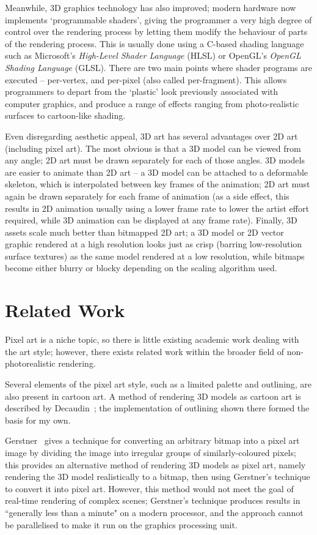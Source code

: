 \documentclass[12pt,twoside,notitlepage]{report}
\begin{document}
Meanwhile, 3D graphics technology has also improved; modern hardware now implements `programmable shaders', giving the programmer a very high degree of control over the rendering process by letting them modify the behaviour of parts of the rendering process. This is usually done using a C-based shading language such as Microsoft's \textit{High-Level Shader Language} (HLSL) or OpenGL's \textit{OpenGL Shading Language} (GLSL). There are two main points where shader programs are executed -- per-vertex, and per-pixel (also called per-fragment). This allows programmers to depart from the `plastic' look previously associated with computer graphics, and produce a range of effects ranging from photo-realistic surfaces to cartoon-like shading.

Even disregarding aesthetic appeal, 3D art has several advantages over 2D art (including pixel art). The most obvious is that a 3D model can be viewed from any angle; 2D art must be drawn separately for each of those angles. 3D models are easier to animate than 2D art -- a 3D model can be attached to a deformable skeleton, which is interpolated between key frames of the animation; 2D art must again be drawn separately for each frame of animation (as a side effect, this results in 2D animation usually using a lower frame rate to lower the artist effort required, while 3D animation can be displayed at any frame rate). Finally, 3D assets scale much better than bitmapped 2D art; a 3D model or 2D vector graphic rendered at a high resolution looks just as crisp (barring low-resolution surface textures) as the same model rendered at a low resolution, while bitmaps become either blurry or blocky depending on the scaling algorithm used.

\section{Related Work}

Pixel art is a niche topic, so there is little existing academic work dealing with the art style; however, there exists related work within the broader field of non-photorealistic rendering.

Several elements of the pixel art style, such as a limited palette and outlining, are also present in cartoon art. A method of rendering 3D models as cartoon art is described by Decaudin~\cite{Decaudin:1996:CLR}; the implementation of outlining shown there formed the basis for my own.

Gerstner~\cite{Gerstner:2012:PIA} gives a technique for converting an arbitrary bitmap into a pixel art image by dividing the image into irregular groups of similarly-coloured pixels; this provides an alternative method of rendering 3D models as pixel art, namely rendering the 3D model realistically to a bitmap, then using Gerstner's technique to convert it into pixel art. However, this method would not meet the goal of real-time rendering of complex scenes; Gerstner's technique produces results in ``generally less than a minute" on a modern processor, and the approach cannot be parallelised to make it run on the graphics processing unit.
\end{document}
